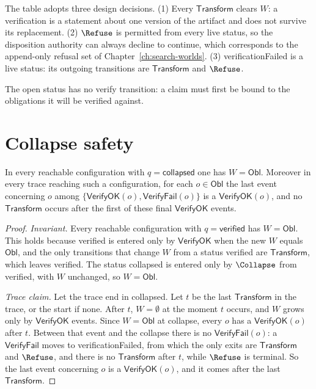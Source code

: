 The table adopts three design decisions. (1) Every $\mathsf{Transform}$ clears $W$: a verification is a statement about one version of the artifact and does not survive its replacement. (2) $\Refuse$ is permitted from every live status, so the disposition authority can always decline to continue, which corresponds to the append-only refusal set of Chapter~\ref{ch:search-worlds}. (3) \textsf{verificationFailed} is a live status: its outgoing transitions are $\mathsf{Transform}$ and $\Refuse$.

The \textsf{open} status has no verify transition: a claim must first be bound to the obligations it will be verified against.

\section{Collapse safety}

\begin{theorem}
\label{thm:collapse-safety}
In every reachable configuration with $q=\textsf{collapsed}$ one has $W=\mathsf{Obl}$. Moreover in every trace reaching such a configuration, for each $o\in\mathsf{Obl}$ the last event concerning $o$ among $\{\mathsf{VerifyOK}(o),\mathsf{VerifyFail}(o)\}$ is a $\mathsf{VerifyOK}(o)$, and no $\mathsf{Transform}$ occurs after the first of these final $\mathsf{VerifyOK}$ events.
\end{theorem}

\begin{proof}
\emph{Invariant.} Every reachable configuration with $q=\textsf{verified}$ has $W=\mathsf{Obl}$. This holds because \textsf{verified} is entered only by $\mathsf{VerifyOK}$ when the new $W$ equals $\mathsf{Obl}$, and the only transitions that change $W$ from a status \textsf{verified} are $\mathsf{Transform}$, which leaves \textsf{verified}. The status \textsf{collapsed} is entered only by $\Collapse$ from \textsf{verified}, with $W$ unchanged, so $W=\mathsf{Obl}$.

\emph{Trace claim.} Let the trace end in \textsf{collapsed}. Let $t$ be the last $\mathsf{Transform}$ in the trace, or the start if none. After $t$, $W=\emptyset$ at the moment $t$ occurs, and $W$ grows only by $\mathsf{VerifyOK}$ events. Since $W=\mathsf{Obl}$ at collapse, every $o$ has a $\mathsf{VerifyOK}(o)$ after $t$. Between that event and the collapse there is no $\mathsf{VerifyFail}(o)$: a $\mathsf{VerifyFail}$ moves to \textsf{verificationFailed}, from which the only exits are $\mathsf{Transform}$ and $\Refuse$, and there is no $\mathsf{Transform}$ after $t$, while $\Refuse$ is terminal. So the last event concerning $o$ is a $\mathsf{VerifyOK}(o)$, and it comes after the last $\mathsf{Transform}$.
\end{proof}

